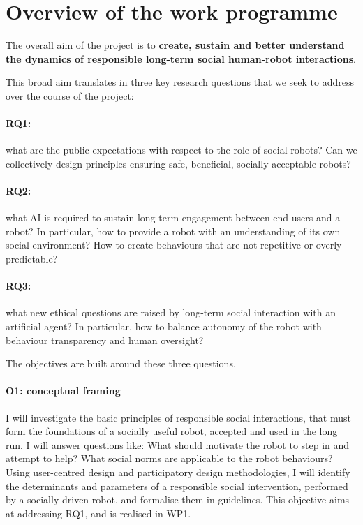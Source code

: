 \section{Overview of the \project work programme}


The overall aim of the \project project is to \textbf{create, sustain and better
understand the dynamics of responsible long-term social human-robot
interactions}.

This broad aim translates in three key research questions that we seek to
address over the course of the project:

\paragraph{\bf RQ1:} what are the public expectations with respect to the role of social
        robots? Can we collectively design principles ensuring safe, beneficial, socially
        acceptable robots? 

\paragraph{\bf RQ2:} what AI is required to sustain long-term engagement between end-users
        and a robot? In particular, how to provide a robot with an understanding
        of its own social environment? How to create behaviours that are not
        repetitive or overly predictable?

\paragraph{\bf RQ3:} what new ethical questions are raised by long-term social interaction
        with an artificial agent? In particular, how to balance autonomy of the
        robot with behaviour transparency and human oversight?

\vspace{0.5em}
\noindent The \project objectives are built around these three questions.

\paragraph{\bf O1: conceptual framing} I will investigate the basic principles
of responsible social interactions, that must form the foundations of a socially
useful robot, accepted and used in the long run. I will answer questions like:
What should motivate the robot to step in and attempt to help? What social norms
are applicable to the robot behaviours? Using user-centred design and
participatory design methodologies, I will identify the determinants and
parameters of a responsible social intervention, performed by a socially-driven
robot, and formalise them in guidelines. This objective aims at addressing RQ1,
and is realised in WP1.

